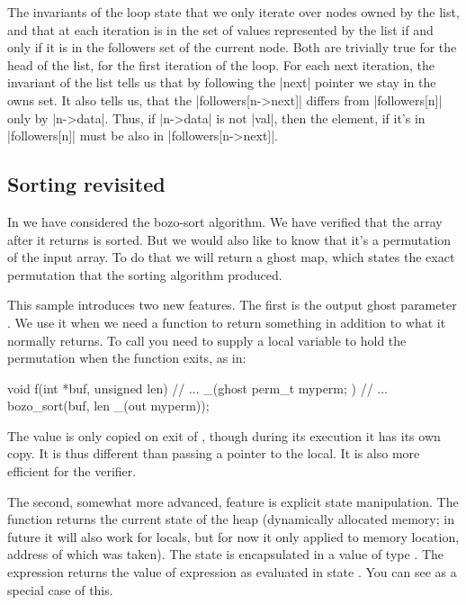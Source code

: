 \noindent
The invariants of the  loop state that we only iterate over
nodes owned by the list, and that at each iteration  is in the
set of values represented by the list if and only if it is in the followers
set of the current node.
Both are trivially true for the head of the list, for the first iteration
of the loop.
For each next iteration, the invariant of the list tells us that by following
the \vcc|next| pointer we stay in the owns set.
It also tells us, that the \vcc|followers[n->next]| differs
from \vcc|followers[n]| only by \vcc|n->data|.
Thus, if \vcc|n->data| is not \vcc|val|, then the element,
if it's in \vcc|followers[n]| must be also in \vcc|followers[n->next]|.

\subsection{Sorting revisited}
\label{sect:sorting-perm}

In  we have considered the bozo-sort algorithm. 
We have verified that the array after it returns is sorted.
But we would also like to know that it's a permutation of the input array.
To do that we will return a ghost map, which states the exact permutation
that the sorting algorithm produced.


This sample introduces two new features.
The first is the output ghost parameter .
We use it when we need a function to return something in addition to what it normally returns.
To call  you need to supply a local variable to hold
the permutation when the function exits, as in:
\begin{VCC}
void f(int *buf, unsigned len)
  // ...
{
  _(ghost perm_t myperm; )
  // ...
  bozo_sort(buf, len _(out myperm));
}
\end{VCC}
The value is only copied on exit of , though during its execution 
it has its own copy.
It is thus different than passing a pointer to the local.
It is also more efficient for the verifier.

The second, somewhat more advanced, feature is explicit state manipulation.
The function \vcc{\now()} returns the current state of the heap (\ie dynamically
allocated memory; in future it will also work for locals, but for now it only applied
to memory location, address of which was taken). 
The state is encapsulated in a value of type \vcc{\state}.
The expression  returns the value of expression
 as evaluated in state . 
You can see   as a special case of this.

